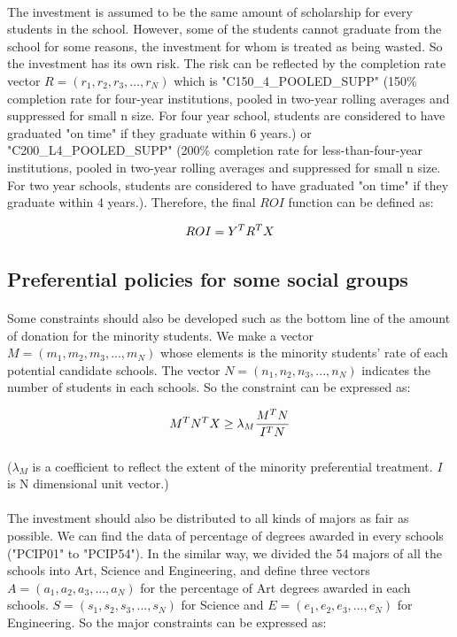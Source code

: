 \documentclass{mcmthesis}
\begin{document}
\paragraph{} The investment is assumed to be the same amount of scholarship for every students in the school. However, some of the students cannot graduate from  the school for some reasons, the investment for whom is treated as being wasted. So the investment has its own risk. The risk can be reflected by the completion rate vector $R=(r_1, r_2, r_3, ..., r_N)$ which is "C150\_4\_POOLED\_SUPP" (150\% completion rate for four-year institutions, pooled in two-year rolling averages and suppressed for small n size.  For four year school, students are considered to have graduated "on time" if they graduate within 6 years.) or "C200\_L4\_POOLED\_SUPP" (200\% completion rate for less-than-four-year institutions, pooled in two-year rolling averages and suppressed for small n size.  For two year schools, students are considered to have graduated "on time" if they graduate within 4 years.). Therefore, the final $ROI$ function can be defined as:

\begin{align}
ROI=Y^T\*R^T\*X
\end{align}

\subsection{Preferential policies for some social groups}  
\paragraph{} Some constraints should also be developed such as the bottom line of the amount of donation for the minority students. We make a vector $M=(m_1, m_2, m_3, ..., m_N)$ whose elements is the minority students' rate of each potential candidate schools. The vector $N=(n_1, n_2, n_3, ..., n_N)$ indicates the number of students in each schools. So the constraint can be expressed as:
 
\begin{align}
M^T\*N^T\*X\geq\lambda_M\*\frac{M^T\*N}{I^T\*N}
\end{align}

\subparagraph{} ($\lambda_M$ is a coefficient to reflect the extent of the minority preferential treatment. $I$ is N dimensional unit vector.)
 
\paragraph{} The investment should also be distributed to all kinds of majors as fair as possible. We can find the data of percentage of degrees awarded in every schools ("PCIP01" to "PCIP54"). In the similar way, we divided the 54 majors of all the schools into Art, Science and Engineering, and define three vectors $A=(a_1, a_2, a_3, ..., a_N)$ for the percentage of Art degrees awarded in each schools. $S=(s_1, s_2, s_3, ..., s_N)$ for Science and $E=(e_1, e_2, e_3, ..., e_N)$ for Engineering. So the  major constraints can be expressed as:
\end{document}
